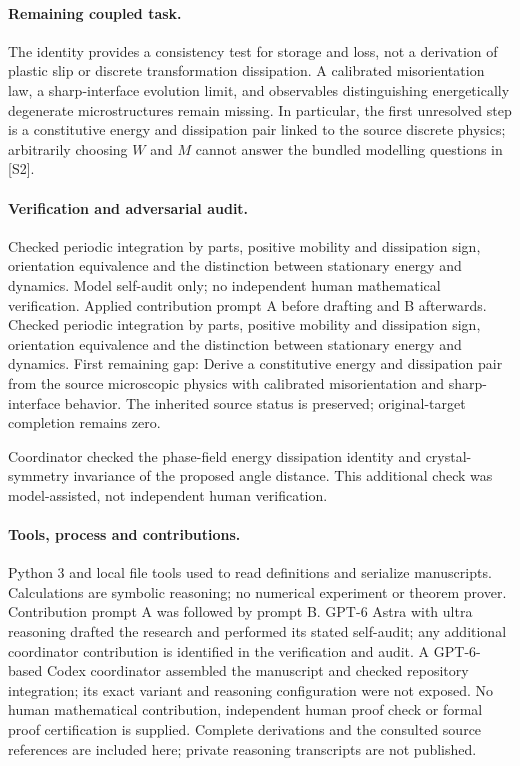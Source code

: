 \documentclass[11pt]{article}
\begin{document}
\paragraph{Remaining coupled task.} The identity provides a consistency test for storage and loss, not a derivation of plastic slip or discrete transformation dissipation. A calibrated misorientation law, a sharp-interface evolution limit, and observables distinguishing energetically degenerate microstructures remain missing. In particular, the first unresolved step is a constitutive energy and dissipation pair linked to the source discrete physics; arbitrarily choosing \(W\) and \(M\) cannot answer the bundled modelling questions in [S2].

\paragraph{Verification and adversarial audit.}
Checked periodic integration by parts, positive mobility and dissipation sign, orientation equivalence and the distinction between stationary energy and dynamics. Model self-audit only; no independent human mathematical verification. Applied contribution prompt A before drafting and B afterwards. Checked periodic integration by parts, positive mobility and dissipation sign, orientation equivalence and the distinction between stationary energy and dynamics. First remaining gap: Derive a constitutive energy and dissipation pair from the source microscopic physics with calibrated misorientation and sharp-interface behavior. The inherited source status is preserved; original-target completion remains zero.

Coordinator checked the phase-field energy dissipation identity and crystal-symmetry invariance of the proposed angle distance. This additional check was model-assisted, not independent human verification.

\paragraph{Tools, process and contributions.}
Python 3 and local file tools used to read definitions and serialize manuscripts. Calculations are symbolic reasoning; no numerical experiment or theorem prover. Contribution prompt A was followed by prompt B. GPT-6 Astra with ultra reasoning drafted the research and performed its stated self-audit; any additional coordinator contribution is identified in the verification and audit. A GPT-6-based Codex coordinator assembled the manuscript and checked repository integration; its exact variant and reasoning configuration were not exposed. No human mathematical contribution, independent human proof check or formal proof certification is supplied. Complete derivations and the consulted source references are included here; private reasoning transcripts are not published.
\end{document}
